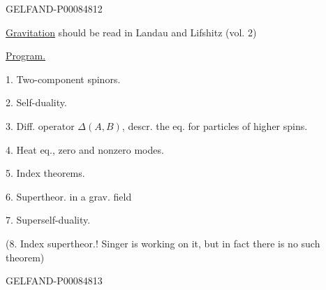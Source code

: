 \begin{GelfandAdjacentEvidence}{GELFAND-P000848}{12}


\uline{Gravitation} should be read in Landau and Lifshitz (vol. 2)



\uline{Program.}

1. Two-component spinors.

2. Self-duality.

3. Diff. operator \(\Delta(A,B)\), descr. the eq. for particles of higher spins.

4. Heat eq., zero and nonzero modes.

5. Index theorems.

6. Supertheor. in a grav. field

7. Superself-duality.

(8. Index supertheor.! Singer is working on it, but in fact there is no such theorem)
\end{GelfandAdjacentEvidence}
\begin{GelfandAdjacentEvidence}{GELFAND-P000848}{13}

\end{GelfandAdjacentEvidence}



